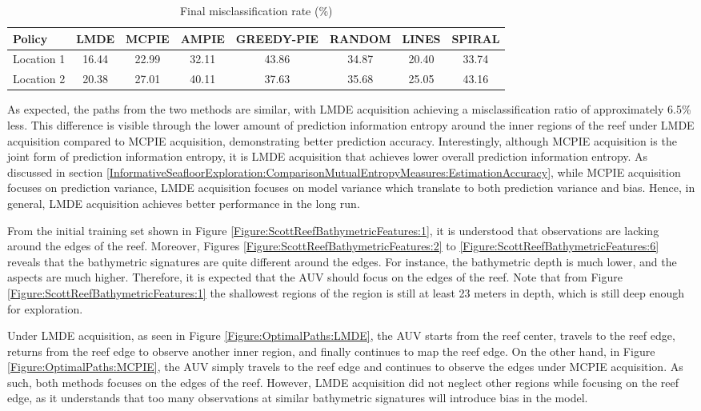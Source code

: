 			\begin{table}[t]
				{\footnotesize
				\begin{center}
					\begin{tabular}{ l c c c c c c c }
					\hline
					Policy & LMDE & MCPIE & AMPIE & GREEDY-PIE & RANDOM & LINES & SPIRAL \\
					\hline
					Location 1 & 16.44 & 22.99 & 32.11 & 43.86 & 34.87 & 20.40 & 33.74 \\
					Location 2 & 20.38 & 27.01 & 40.11 & 37.63 & 35.68 & 25.05 & 43.16 \\
					\hline
					\end{tabular}
				\end{center}
				}
		  	\caption{Final misclassification rate (\%)}
		  	\label{Table:CompareMethods}			
		  	\end{table}	
	  	
			As expected, the paths from the two methods are similar, with LMDE acquisition achieving a misclassification ratio of approximately 6.5\% less. This difference is visible through the lower amount of prediction information entropy around the inner regions of the reef under LMDE acquisition compared to MCPIE acquisition, demonstrating better prediction accuracy. Interestingly, although MCPIE acquisition is the joint form of prediction information entropy, it is LMDE acquisition that achieves lower overall prediction information entropy. As discussed in section \ref{InformativeSeafloorExploration:ComparisonMutualEntropyMeasures:EstimationAccuracy}, while MCPIE acquisition focuses on prediction variance, LMDE acquisition focuses on model variance which translate to both prediction variance and bias. Hence, in general, LMDE acquisition achieves better performance in the long run.
			
			From the initial training set shown in Figure \ref{Figure:ScottReefBathymetricFeatures:1}, it is understood that observations are lacking around the edges of the reef. Moreover, Figures \ref{Figure:ScottReefBathymetricFeatures:2} to \ref{Figure:ScottReefBathymetricFeatures:6} reveals that the bathymetric signatures are quite different around the edges. For instance, the bathymetric depth is much lower, and the aspects are much higher. Therefore, it is expected that the AUV should focus on the edges of the reef. Note that from Figure \ref{Figure:ScottReefBathymetricFeatures:1} the shallowest regions of the region is still at least 23 meters in depth, which is still deep enough for exploration.
			
			Under LMDE acquisition, as seen in Figure \ref{Figure:OptimalPaths:LMDE}, the AUV starts from the reef center, travels to the reef edge, returns from the reef edge to observe another inner region, and finally continues to map the reef edge. On the other hand, in Figure \ref{Figure:OptimalPaths:MCPIE}, the AUV simply travels to the reef edge and continues to observe the edges under MCPIE acquisition. As such, both methods focuses on the edges of the reef. However, LMDE acquisition did not neglect other regions while focusing on the reef edge, as it understands that too many observations at similar bathymetric signatures will introduce bias in the model.
		
